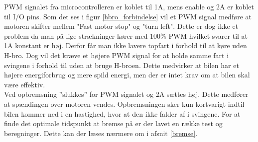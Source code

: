 PWM signalet fra microcontrolleren er koblet til 1A, mens enable og 2A er koblet til I/O pins. Som det ses i figur \ref{hbro_forbindelse} vil et PWM signal medføre at motoren skifter mellem "Fast motor stop" og "turn left". Dette er dog ikke et problem da man på lige strækninger kører med 100\% PWM hvilket svarer til at 1A konstant er høj. Derfor får man ikke lavere topfart i forhold til at køre uden H-bro. Dog vil det kræve et højere PWM signal for at holde samme fart i svingene i forhold til uden at bruge H-broen. Dette medvirker at bilen har et højere energiforbrug og mere spild energi, men der er intet krav om at bilen skal være effektiv. \\

Ved opbremsning ”slukkes” for PWM signalet og 2A sættes høj. Dette medfører at spændingen over motoren vendes. Opbremsningen sker kun kortvarigt indtil bilen kommer ned i en hastighed, hvor at den ikke falder af i svingene. For at finde det optimale tidspunkt at bremse på er der lavet en række test og beregninger. Dette kan der læses nærmere om i afsnit \ref{bremse}.
